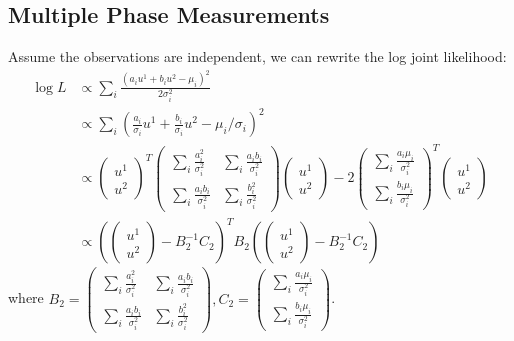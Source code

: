 \documentclass{article}
\begin{document}
\subsection{Multiple Phase Measurements}
Assume the observations are independent,
we can rewrite the log joint likelihood:
\begin{align}
\log L&\propto \sum_i \frac{(a_iu^1+b_iu^2-\mu_i)^2}{2\sigma_i^2}\nonumber\\
&\propto \sum_i(\frac{a_i}{\sigma_i}u^1+\frac{b_i}{\sigma_i}u^2-\mu_i/\sigma_i)^2\nonumber\\
&\propto
\left( \begin{array}{c} u^1\\u^2 \end{array} \right)^T
\left( \begin{array}{cc} \sum_i\frac{a_i^2}{\sigma_i^2}&\sum_i\frac{a_ib_i}{\sigma_i^2}\\\sum_i\frac{a_ib_i}{\sigma_i^2}&\sum_i\frac{b_i^2}{\sigma_i^2}\end{array} \right)
\left( \begin{array}{c} u^1\\u^2 \end{array} \right)
-2\left( \begin{array}{c} \sum_i\frac{a_i\mu_i}{\sigma_i^2}\\\sum_i\frac{b_i\mu_i}{\sigma_i^2} \end{array} \right)^T
\left( \begin{array}{c} u^1\\u^2 \end{array} \right)\nonumber\\
&\propto 
\left( (\begin{array}{c} u^1\\u^2 \end{array})-B_2^{-1}C_2 \right)^T
B_2
\left( (\begin{array}{c} u^1\\u^2 \end{array})-B_2^{-1}C_2 \right)
\end{align}
where $B_2=\left( \begin{array}{cc} \sum_i\frac{a_i^2}{\sigma_i^2}&\sum_i\frac{a_ib_i}{\sigma_i^2}\\\sum_i\frac{a_ib_i}{\sigma_i^2}&\sum_i\frac{b_i^2}{\sigma_i^2}\end{array} \right), C_2=\left( \begin{array}{c} \sum_i\frac{a_i\mu_i}{\sigma_i^2}\\\sum_i\frac{b_i\mu_i}{\sigma_i^2} \end{array} \right)$.
\end{document}

